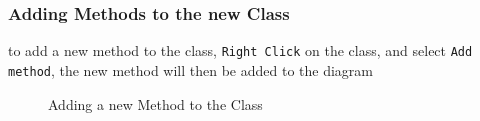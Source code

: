 \documentclass[a4paper]{article}
\begin{document}
{\subsubsection{Adding Methods to the new Class}
to add a new method to the class, \texttt{Right Click} on the class, and select \texttt{Add method}, the new method will then be added to the diagram

\begin{figure}[H]
\begin{center}
 \imagespace
{}
\caption{Adding a new Method to the Class}
\end{center}
\end{figure}

}
\end{document}
